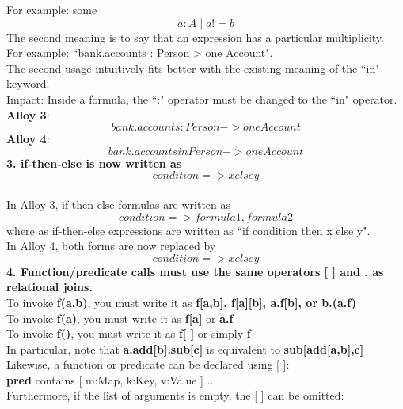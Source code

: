 \documentclass[a4paper,12pt]{extarticle}
\begin{document}
For example: some \begin{equation}
 a:A \mid a!=b
\end{equation}
The second meaning is to say that an expression has a particular multiplicity.\\
For example: ``bank.accounts : Person \-> one Account".\\
The second usage intuitively fits better with the existing meaning of the ``in" keyword. \\
Impact: Inside a formula, the ``:" operator must be changed to the ``in" operator. \\

\textbf{Alloy 3}:     \begin{equation}
bank.accounts : Person -> one Account
\end{equation}
\textbf{Alloy 4}:    \begin{equation}
bank.accounts in Person ->  one Account
\end{equation}
\textbf{3. if-then-else is now written as \begin{equation}
condition => x else y
\end{equation} } \\
In Alloy 3, if-then-else formulas are written as \begin{equation} condition => formula1,formula2 \end{equation} where as if-then-else expressions are written as ``if condition then x else y". \\
In Alloy 4, both forms are now replaced by \begin{equation} condition => x else y \end{equation}
\textbf{4. Function/predicate calls must use the same operators [ ] and . as relational joins. } \\
To invoke \textbf{f(a,b)}, you must write it as \textbf{f[a,b], f[a][b], a.f[b], or b.(a.f)} \\
To invoke \textbf{f(a)}, you must write it as \textbf{f[a]} or \textbf{a.f} \\
To invoke \textbf{f()}, you must write it as \textbf{f[ ]} or simply \textbf{f} \\
In particular, note that \textbf{a.add[b].sub[c]} is equivalent to \textbf{sub[add[a,b],c]} \\
Likewise, a function or predicate can be declared using [ ]: \\
    \textbf{pred} contains [ m:Map, k:Key, v:Value ] {...} \\
Furthermore, if the list of arguments is empty, the [ ] can be omitted:\\
\end{document}
